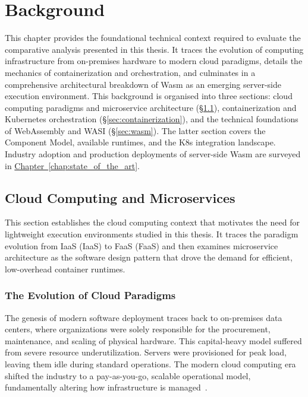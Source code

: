\chapter{Background}
\label{chap:background}

This chapter provides the foundational technical context required to evaluate the comparative analysis presented in this thesis. It traces the evolution of computing infrastructure from on-premises hardware to modern cloud paradigms, details the mechanics of containerization and orchestration, and culminates in a comprehensive architectural breakdown of \ac{Wasm} as an emerging server-side execution environment. This background is organised into three sections: cloud computing paradigms and microservice architecture (\S\ref{sec:cloud_microservices}), containerization and Kubernetes orchestration (\S\ref{sec:containerization}), and the technical foundations of WebAssembly and \acs{WASI} (\S\ref{sec:wasm}). The latter section covers the Component Model, available runtimes, and the \acs{K8s} integration landscape. Industry adoption and production deployments of server-side \acs{Wasm} are surveyed in \hyperref[chap:state_of_the_art]{Chapter~\ref{chap:state_of_the_art}}.

\section{Cloud Computing and Microservices}
\label{sec:cloud_microservices}

This section establishes the cloud computing context that motivates the need for lightweight execution environments studied in this thesis. It traces the paradigm evolution from \acl{IaaS} (\acs{IaaS}) to \acl{FaaS} (\acs{FaaS}) and then examines microservice architecture as the software design pattern that drove the demand for efficient, low-overhead container runtimes.
\subsection{The Evolution of Cloud Paradigms}
The genesis of modern software deployment traces back to on-premises data centers, where organizations were solely responsible for the procurement, maintenance, and scaling of physical hardware. This capital-heavy model suffered from severe resource underutilization. Servers were provisioned for peak load, leaving them idle during standard operations. The modern cloud computing era shifted the industry to a pay-as-you-go, scalable operational model, fundamentally altering how infrastructure is managed~\cite{mell2011nist}.

